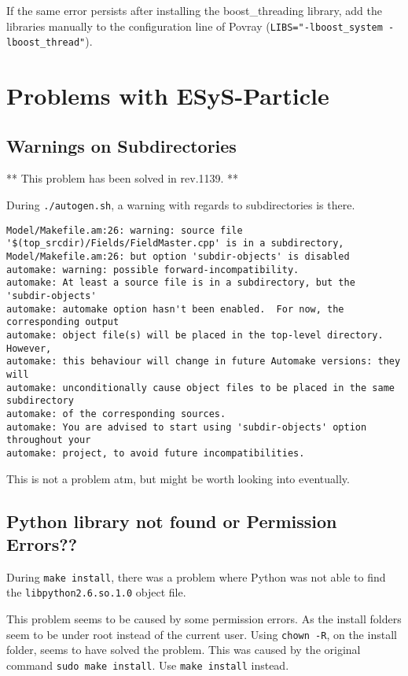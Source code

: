 If the same error persists after installing the boost\_threading library, add the libraries manually to the configuration line of Povray (\lstinline{LIBS="-lboost_system -lboost_thread"}).

\section{Problems with ESyS-Particle} %
\label{sec:problems_with_esys_particle}

\subsection{Warnings on Subdirectories} %

** This problem has been solved in rev.1139. **

During \lstinline{./autogen.sh}, a warning with regards to subdirectories is there.

\begin{lstlisting}[style=inlineBash]
Model/Makefile.am:26: warning: source file '$(top_srcdir)/Fields/FieldMaster.cpp' is in a subdirectory,
Model/Makefile.am:26: but option 'subdir-objects' is disabled
automake: warning: possible forward-incompatibility.
automake: At least a source file is in a subdirectory, but the 'subdir-objects'
automake: automake option hasn't been enabled.  For now, the corresponding output
automake: object file(s) will be placed in the top-level directory.  However,
automake: this behaviour will change in future Automake versions: they will
automake: unconditionally cause object files to be placed in the same subdirectory
automake: of the corresponding sources.
automake: You are advised to start using 'subdir-objects' option throughout your
automake: project, to avoid future incompatibilities.
\end{lstlisting}

This is not a problem atm, but might be worth looking into eventually.

\subsection{Python library not found or Permission Errors??} %

During \lstinline{make install}, there was a problem where Python was not able to find the \lstinline{libpython2.6.so.1.0} object file.

This problem seems to be caused by some permission errors. As the install folders seem to be under root instead of the current user. Using \lstinline{chown -R}, on the install folder, seems to have solved the problem. This was caused by the original command \lstinline{sudo make install}. Use \lstinline{make install} instead.

